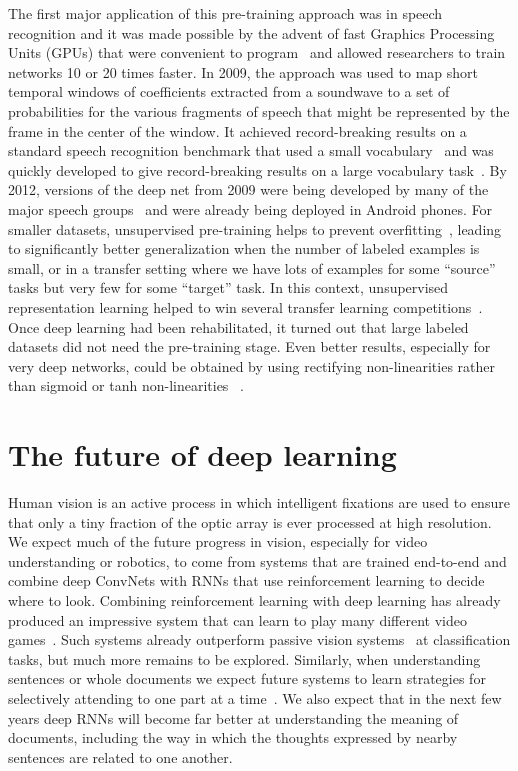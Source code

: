 \documentclass[10pts]{article}
\begin{document}
The first major application of this pre-training approach was in
speech recognition and it was made possible by the advent of fast
Graphics Processing Units (GPUs) that were convenient to
program~\citep{RainaICML09-small} and allowed researchers to train
networks 10 or 20 times faster.  In 2009, the approach was used to map
short temporal windows of coefficients extracted from a soundwave to a
set of probabilities for the various fragments of speech that might be
represented by the frame in the center of the window.  It achieved
record-breaking results on a standard speech recognition benchmark
that used a small vocabulary~\citep{TIMITpaper} and was quickly
developed to give record-breaking results on a large vocabulary
task~\citep{Dahl2012}.  By 2012, versions of the deep net from 2009
were being developed by many of the major speech
groups~\citep{Hinton-et-al-2012} and were already being deployed in
Android phones.  For smaller datasets, unsupervised pre-training helps
to prevent overfitting~\citep{Bengio-Courville-Vincent-TPAMI2013}, leading to
significantly better generalization when the number of labeled
examples is small, or in a transfer setting where we have lots of
examples for some ``source'' tasks but very few for some ``target''
task. In this context, unsupervised representation learning helped to
win several transfer learning
competitions~\citep{UTLC+LISA-2011-small,Goodfellow-icml2012}.  Once
deep learning had been rehabilitated, it turned out that large labeled
datasets did not need the pre-training stage. Even better results,
especially for very deep networks, could be obtained by using
rectifying non-linearities rather than sigmoid or tanh non-linearities
~\citep{Nair-2010-small,Glorot+al-AI-2011-small,Krizhevsky-2012-small,Dahl-et-al-ICASSP2013}.


\section{The future of deep learning}

Human vision is an active process in which intelligent fixations are
used to ensure that only a tiny fraction of the optic array is ever
processed at high resolution. We expect much of the future progress in
vision, especially for video understanding or robotics, to come from
systems that are trained end-to-end and combine deep ConvNets with
RNNs that use reinforcement learning to decide where to look.
Combining reinforcement learning with deep learning has already
produced an impressive system that can learn to play many different
video games~\citep{Mnih-et-al-2015}.  Such systems already outperform passive vision
systems~\citep{ba+mnih} at classification tasks, but much more remains to be
explored.   Similarly, when understanding sentences or
whole documents we expect future systems to learn strategies for
selectively attending to one part at a
time~\citep{Bahdanau-et-al-ICLR2015}. We also expect that in the next
few years deep RNNs will become far better at understanding the
meaning of documents, including the way in which the thoughts
expressed by nearby sentences are related to one another.
\end{document}
